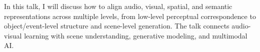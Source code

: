 In this talk, I will discuss how to align audio, visual, spatial, and semantic representations across multiple levels, from low-level perceptual correspondence to object/event-level structure and scene-level generation. The talk connects audio-visual learning with scene understanding, generative modeling, and multimodal AI.
